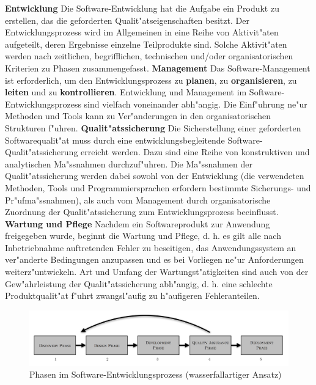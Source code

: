 \textbf{Entwicklung}
\newline
Die Software-Entwicklung hat die Aufgabe ein Produkt zu erstellen, das die geforderten Qualit"atseigenschaften besitzt. Der Entwicklungsprozess wird im Allgemeinen in eine Reihe von Aktivit"aten aufgeteilt, deren Ergebnisse einzelne Teilprodukte sind. Solche Aktivit"aten werden nach zeitlichen, begrifflichen, technischen und/oder organisatorischen Kriterien zu Phasen zusammengefasst.
\smallbreak
\textbf{Management}
\newline
Das Software-Management ist erforderlich, um den Entwicklungsprozess zu \textbf{planen}, zu \textbf{organisieren}, zu \textbf{leiten} und zu \textbf{kontrollieren}. Entwicklung und Management im Software-Entwicklungsprozess sind vielfach voneinander abh"angig. Die Einf"uhrung ne"ur Methoden und Tools kann zu Ver"anderungen in den organisatorischen Strukturen f"uhren.
\smallbreak
\textbf{Qualit"atssicherung}
\newline
Die Sicherstellung einer geforderten Softwarequalit"at muss durch eine entwicklungsbegleitende Software-Qualit"atssicherung erreicht werden. Dazu sind eine Reihe von konstruktiven und analytischen Ma"ssnahmen durchzuf"uhren. Die Ma"ssnahmen der Qualit"atssicherung werden dabei sowohl von der Entwicklung (die verwendeten Methoden, Tools und Programmiersprachen erfordern bestimmte Sicherungs- und Pr"ufma"ssnahmen), als auch vom Management durch organisatorische Zuordnung der Qualit"atssicherung zum Entwicklungsprozess beeinflusst.
\smallbreak
\textbf{Wartung und Pflege}
\newline
Nachdem ein Softwareprodukt zur Anwendung freigegeben wurde, beginnt die Wartung und Pflege, d. h. es gilt alle nach Inbetriebnahme auftretenden Fehler zu beseitigen, das Anwendungssystem an ver"anderte Bedingungen anzupassen und es bei Vorliegen ne"ur Anforderungen weiterz"untwickeln. Art und Umfang der Wartungst"atigkeiten sind auch von der Gew"ahrleistung der Qualit"atssicherung abh"angig, d. h. eine schlechte Produktqualit"at f"uhrt zwangsl"aufig zu h"aufigeren Fehleranteilen.

\newpage
\begin{figure}[H]
  \centering
  \includegraphics[width=1\textwidth]{./images/Softwarezyklus.png}
  \captionsetup{name=Abb.,font=footnotesize}
  \caption{Phasen im Software-Entwicklungsprozess (wasserfallartiger Ansatz)}
\end{figure}

